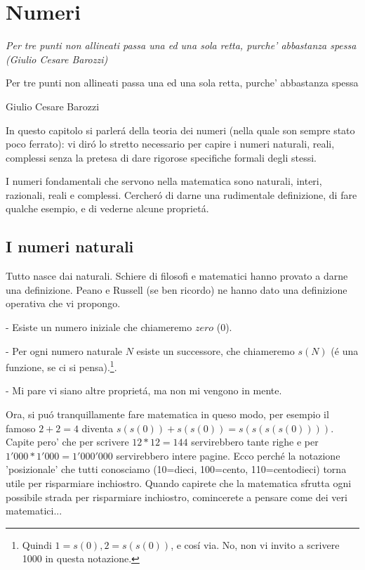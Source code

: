 \label{numeri}
\chapter{Numeri}

\em{Per tre punti non allineati passa una ed una sola retta, purche' abbastanza spessa (Giulio Cesare Barozzi)}

\epigraph{Per tre punti non allineati passa una ed una sola retta, purche' abbastanza spessa}{Giulio Cesare Barozzi}



In questo capitolo si parler\'a della teoria dei numeri (nella quale son sempre stato poco ferrato): vi dir\'o lo stretto necessario per capire i numeri naturali,
reali, complessi senza la pretesa di dare rigorose specifiche formali degli stessi.

I numeri fondamentali che servono nella matematica sono naturali, interi, razionali, reali e complessi. Cercher\'o di darne una rudimentale definizione,
di fare qualche esempio, e di vederne alcune propriet\'a.


\section{I numeri naturali}
Tutto nasce dai naturali. Schiere di filosofi e matematici hanno provato a darne una definizione. Peano e Russell (se ben ricordo) ne hanno dato una definizione operativa che vi propongo.

- Esiste un numero iniziale che chiameremo $zero$ ($0$).

- Per ogni numero naturale $N$ esiste un successore, che chiameremo $s(N)$ (\'e una funzione, se ci si pensa).\footnote{Quindi $1=s(0),2=s(s(0))$, e cos\'i via. 
No, non vi invito a scrivere 1000 in questa notazione.}.

- Mi pare vi siano altre propriet\'a, ma non mi vengono in mente.

Ora, si pu\'o tranquillamente fare matematica in queso modo, per esempio il famoso $2+2=4$ diventa $s(s(0))+s(s(0))=s(s(s(s(0))))$. Capite pero' che per scrivere $12*12=144$ servirebbero tante righe e per $1'000*1'000=1'000'000$ 
servirebbero intere pagine. Ecco perch\'e la notazione 'posizionale' che tutti conosciamo (10=dieci, 100=cento, 110=centodieci) torna utile per risparmiare inchiostro. Quando capirete che la matematica sfrutta ogni possibile strada
per risparmiare inchiostro, comincerete a pensare come dei veri matematici...

